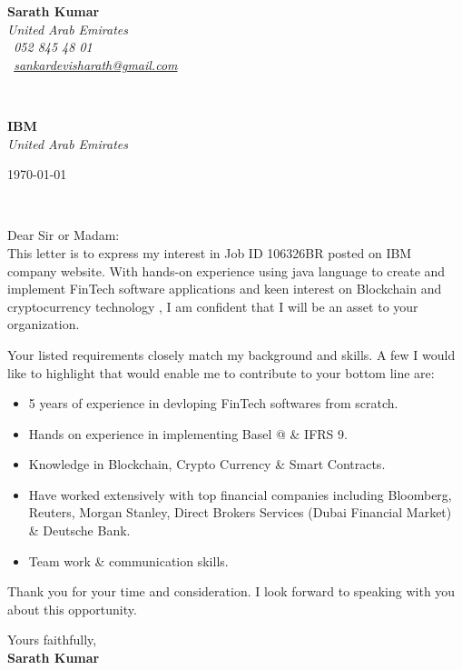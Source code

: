 \documentclass[11pt]{article}
\makeatletter
\newcommand*{\rom}[1]{\expandafter\@slowromancap\romannumeral #1@}
\makeatother
\begin{document}
\sffamily   %
\hfill%
\begin{minipage}[t]{.6\textwidth}
\raggedleft%
{\bfseries Sarath Kumar}\\[.35ex]
\small\itshape%
United Arab Emirates\\[.35ex]
\Telefon~052 845 48 01\\
\Letter~\href{mailto:sankardevisharath@gmail.com}{sankardevisharath@gmail.com}
\end{minipage}\\[1em]
%
\begin{minipage}[t]{.4\textwidth}
\raggedright%
{\bfseries IBM}\\[.35ex]
\small\itshape%
United Arab Emirates
\end{minipage}
\hfill %
\begin{minipage}[t]{.4\textwidth}
\raggedleft %
\today
\end{minipage}\\[2em]
\raggedright
Dear Sir or Madam:\\[1.5em]
%

This letter is to express my interest in Job ID 106326BR posted on IBM company website. With hands-on experience using java language to create and implement FinTech software applications and keen interest on Blockchain and cryptocurrency technology , I am confident that I will be an asset to your organization.

Your listed requirements closely match my background and skills. A few I would like to highlight that would enable me to contribute to your bottom line are:

\begin{itemize}
\item 5 years of experience in devloping FinTech softwares from scratch.
\item Hands on experience in implementing Basel \rom{3} \& IFRS 9.
\item Knowledge in Blockchain, Crypto Currency \& Smart Contracts.
\item Have worked extensively with top financial companies including Bloomberg, Reuters, Morgan Stanley, Direct Brokers Services (Dubai Financial Market) \& Deutsche Bank.
\item Team work \& communication skills.
\end{itemize}
Thank you for your time and consideration. I look forward to speaking with you about this opportunity.

Yours faithfully,\\[2em] %
%
{\bfseries Sarath Kumar}\\
%
\vfill%
\end{document}
